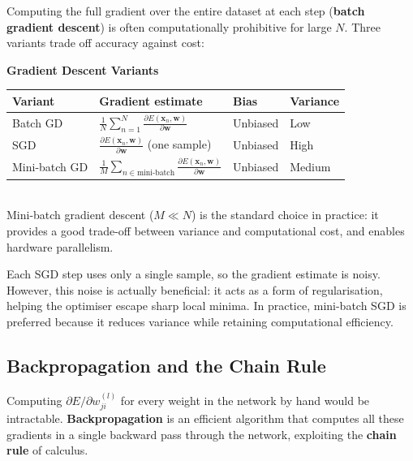 \documentclass[11pt,a4paper]{article}
\newcommand{\term}[1]{\textcolor{DefGreen}{\textbf{#1}}}
\begin{document}
Computing the full gradient over the entire dataset at each step (\term{batch gradient descent}) is often computationally prohibitive for large $N$. Three variants trade off accuracy against cost:

\begin{tcolorbox}[colback=LightBlue,colframe=AccentBlue,boxrule=0.8pt,arc=3pt]
\textbf{Gradient Descent Variants}\\[6pt]
\begin{tabular}{@{}llll@{}}
\toprule
\textbf{Variant} & \textbf{Gradient estimate} & \textbf{Bias} & \textbf{Variance} \\
\midrule
Batch GD & $\frac{1}{N}\sum_{n=1}^N \frac{\partial E(\mathbf{x}_n,\mathbf{w})}{\partial \mathbf{w}}$ & Unbiased & Low \\
SGD & $\frac{\partial E(\mathbf{x}_n,\mathbf{w})}{\partial \mathbf{w}}$ (one sample) & Unbiased & High \\
Mini-batch GD & $\frac{1}{M}\sum_{n \in \text{mini-batch}} \frac{\partial E(\mathbf{x}_n,\mathbf{w})}{\partial \mathbf{w}}$ & Unbiased & Medium \\
\bottomrule
\end{tabular}\\[6pt]
Mini-batch gradient descent ($M \ll N$) is the standard choice in practice: it provides a good trade-off between variance and computational cost, and enables hardware parallelism.
\end{tcolorbox}

\begin{insightbox}
Each SGD step uses only a single sample, so the gradient estimate is noisy. However, this noise is actually beneficial: it acts as a form of regularisation, helping the optimiser escape sharp local minima. In practice, mini-batch SGD is preferred because it reduces variance while retaining computational efficiency.
\end{insightbox}

\subsection{Backpropagation and the Chain Rule}

Computing $\partial E / \partial w_{ji}^{(l)}$ for every weight in the network by hand would be intractable. \term{Backpropagation} is an efficient algorithm that computes all these gradients in a single backward pass through the network, exploiting the \term{chain rule} of calculus.
\end{document}
